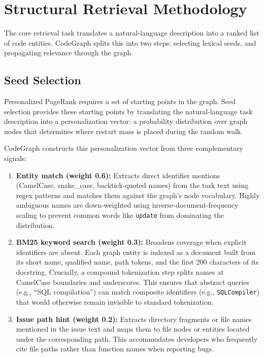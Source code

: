 \section{Structural Retrieval Methodology}
\label{sec:methodology}

The core retrieval task translates a natural-language description into a ranked list of code entities. CodeGraph splits this into two steps: selecting lexical seeds, and propagating relevance through the graph.

\subsection{Seed Selection}

Personalized PageRank requires a set of starting points in the graph. Seed selection provides these starting points by translating the natural-language task description into a personalization vector: a probability distribution over graph nodes that determines where restart mass is placed during the random walk.

CodeGraph constructs this personalization vector from three complementary signals:
\begin{enumerate}
    \item \textbf{Entity match (weight 0.6):} Extracts direct identifier mentions (CamelCase, snake\_case, backtick-quoted names) from the task text using regex patterns and matches them against the graph's node vocabulary. Highly ambiguous names are down-weighted using inverse-document-frequency scaling to prevent common words like \texttt{update} from dominating the distribution.
    \item \textbf{BM25 keyword search (weight 0.3):} Broadens coverage when explicit identifiers are absent. Each graph entity is indexed as a document built from its short name, qualified name, path tokens, and the first 200 characters of its docstring. Crucially, a compound tokenization step splits names at CamelCase boundaries and underscores. This ensures that abstract queries (e.g., ``SQL compilation'') can match composite identifiers (e.g., \texttt{SQLCompiler}) that would otherwise remain invisible to standard tokenization.
    \item \textbf{Issue path hint (weight 0.2):} Extracts directory fragments or file names mentioned in the issue text and maps them to file nodes or entities located under the corresponding path. This accommodates developers who frequently cite file paths rather than function names when reporting bugs.
\end{enumerate}

